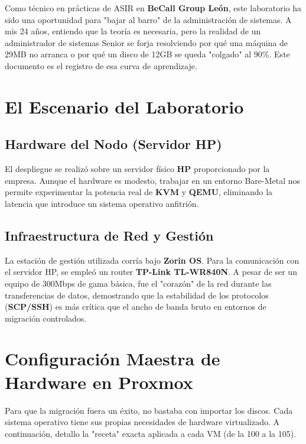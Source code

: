 \documentclass[11pt, a4paper]{article}
\begin{document}
Como técnico en prácticas de ASIR en \textbf{BeCall Group León}, este laboratorio ha sido una oportunidad para "bajar al barro" de la administración de sistemas. A mis 24 años, entiendo que la teoría es necesaria, pero la realidad de un administrador de sistemas Senior se forja resolviendo por qué una máquina de 29MB no arranca o por qué un disco de 12GB se queda "colgado" al 90\%. Este documento es el registro de esa curva de aprendizaje.

\section{El Escenario del Laboratorio}

\subsection{Hardware del Nodo (Servidor HP)}
El despliegue se realizó sobre un servidor físico \textbf{HP} proporcionado por la empresa. Aunque el hardware es modesto, trabajar en un entorno Bare-Metal nos permite experimentar la potencia real de \textbf{KVM} y \textbf{QEMU}, eliminando la latencia que introduce un sistema operativo anfitrión.

\subsection{Infraestructura de Red y Gestión}
La estación de gestión utilizada corría bajo \textbf{Zorin OS}. Para la comunicación con el servidor HP, se empleó un router \textbf{TP-Link TL-WR840N}. A pesar de ser un equipo de 300Mbps de gama básica, fue el "corazón" de la red durante las transferencias de datos, demostrando que la estabilidad de los protocolos (\textbf{SCP/SSH}) es más crítica que el ancho de banda bruto en entornos de migración controlados.


\section{Configuración Maestra de Hardware en Proxmox}
Para que la migración fuera un éxito, no bastaba con importar los discos. Cada sistema operativo tiene sus propias necesidades de hardware virtualizado. A continuación, detallo la "receta" exacta aplicada a cada VM (de la 100 a la 105).
\end{document}
